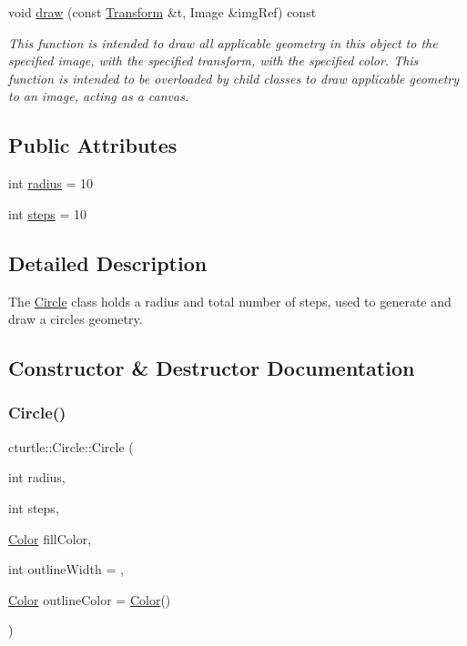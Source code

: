 \begin{DoxyCompactItemize}
void \hyperlink{classcturtle_1_1Circle_a7c95f8f4d126e38661e4ee94be58a8c4}{draw} (const \hyperlink{classcturtle_1_1Transform}{Transform} \&t, Image \&img\+Ref) const
\begin{DoxyCompactList}\small\item\em This function is intended to draw all applicable geometry in this object to the specified image, with the specified transform, with the specified color. This function is intended to be overloaded by child classes to draw applicable geometry to an image, acting as a canvas. \end{DoxyCompactList}\end{DoxyCompactItemize}
\subsection*{Public Attributes}
\begin{DoxyCompactItemize}
\item 
int \hyperlink{classcturtle_1_1Circle_a01dfc45c6a56b58e040e4de2cc8abda5}{radius} = 10
\item 
int \hyperlink{classcturtle_1_1Circle_a5bf905891d9a0d21b08070698c71321e}{steps} = 10
\end{DoxyCompactItemize}


\subsection{Detailed Description}
The \hyperlink{classcturtle_1_1Circle}{Circle} class holds a radius and total number of steps, used to generate and draw a circles geometry. 

\subsection{Constructor \& Destructor Documentation}
\mbox{\label{classcturtle_1_1Circle_ae9fff4148fa917a5bac60301985ea085}} 
\subsubsection{\texorpdfstring{Circle()}{Circle()}\hspace{0.1cm}{\footnotesize\ttfamily [1/2]}}
{\footnotesize\ttfamily cturtle\+::\+Circle\+::\+Circle (\begin{DoxyParamCaption}\item[{int}]{radius,  }\item[{int}]{steps,  }\item[{\hyperlink{classcturtle_1_1Color}{Color}}]{fill\+Color,  }\item[{int}]{outline\+Width = {},  }\item[{\hyperlink{classcturtle_1_1Color}{Color}}]{outline\+Color = {\ttfamily \hyperlink{classcturtle_1_1Color}{Color}()} }\end{DoxyParamCaption})\hspace{0.3cm}{\ttfamily [inline]}}



